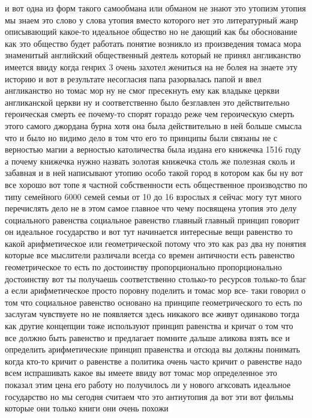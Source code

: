 и вот
одна из форм такого самообмана или обманом не знают это утопизм утопия мы знаем
это слово у слова утопия вместо которого нет это литературный жанр описывающий
какое-то идеальное общество но не дающий как бы обоснование как это общество
будет работать понятие возникло из произведения томаса мора знаменитый
английский общественный деятель который не принял англиканство имеется ввиду
когда генрих 3 очень захотел жениться на не болея на знаете эту историю и вот в
результате несогласия папа разорвалась папой и ввел англиканство но томас мор ну
не смог пресекнуть ему как владыке церкви англиканской церкви ну и
соответственно было безглавлен это действительно героическая смерть ее почему-то
спорят гораздо реже чем героическую смерть этого самого джордана бурна хотя она
была действительно в ней больше смысла что и было но видимо дело в том что его
то принципы были связаны не с верностью магии а верностью католичества была
издана его книжечка 1516 году а почему книжечка нужно назвать золотая книжечка
столь же полезная сколь и забавная и в ней написывают утопию особо такой город в
котором как бы ну вот все хорошо вот топе я частной собственности есть
общественное производство по типу семейного 6000 семей семьи от 10 до 16
взрослых я сейчас могу тут много перечислять дело не в этом самое главное что
чему посвящена утопия это делу социального равенства социальное равенство
главный главный принцип говорит он идеальное государство и вот тут начинается
интересные вещи равенство то какой арифметическое или геометрической потому что
это как раз два ну понятия которые все мыслители различали всегда со времен
античности есть равенство геометрическое то есть по достоинству пропорционально
пропорционально достоинству вот ты получаешь соответственно столько-то ресурсов
только-то благ а если арифметическое просто поровну поделить и томас мор все-
таки говорил о том что социальное равенство основано на принципе геометрического
то есть по заслугам чувствуете но не появляется здесь никакого все живут
одинаково тогда как другие концепции тоже используют принцип равенства и кричат
о том что все должно быть равенство и предлагает помните дальше аликова взять
все и определить арифметические принцип правенства и отсюда вы должны понимать
когда кто-то кричит о равенстве а политика очень часто кричит о равенстве надо
всем испрашивать какое вы имеете ввиду вот томас мор определенное это показал
этим цена его работу но получилось ли у нового агксовать идеальное государство
но мы сегодня считаем что это антиутопия да вот эти вот фильмы которые они
только книги они очень похожи 

